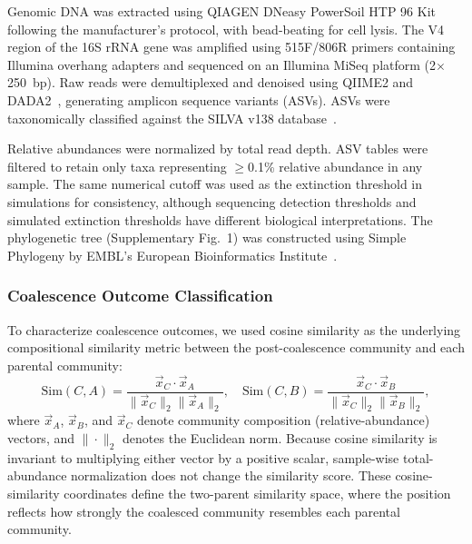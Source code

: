 Genomic DNA was extracted using QIAGEN DNeasy PowerSoil HTP 96 Kit following the manufacturer's protocol, with bead-beating for cell lysis. The V4 region of the 16S rRNA gene was amplified using 515F/806R primers containing Illumina overhang adapters and sequenced on an Illumina MiSeq platform (2$\times$250~bp). Raw reads were demultiplexed and denoised using QIIME2 and DADA2~\citep{Callahan2016}, generating amplicon sequence variants (ASVs). ASVs were taxonomically classified against the SILVA v138 database~\citep{Quast2013}.

Relative abundances were normalized by total read depth. ASV tables were filtered to retain only taxa representing $\geq$0.1\% relative abundance in any sample. The same numerical cutoff was used as the extinction threshold in simulations for consistency, although sequencing detection thresholds and simulated extinction thresholds have different biological interpretations. The phylogenetic tree (Supplementary Fig.~1) was constructed using Simple Phylogeny by EMBL's European Bioinformatics Institute~\citep{Madeira2022}.


\subsubsection*{Coalescence Outcome Classification}
\label{sec:suppl:methods:classification}

To characterize coalescence outcomes, we used cosine similarity as the underlying compositional similarity metric between the post-coalescence community and each parental community:
\begin{equation}
\text{Sim}(C, A) = \frac{\vec{x}_C \cdot \vec{x}_A}{\|\vec{x}_C\|_2 \|\vec{x}_A\|_2}, \quad
\text{Sim}(C, B) = \frac{\vec{x}_C \cdot \vec{x}_B}{\|\vec{x}_C\|_2 \|\vec{x}_B\|_2},
\end{equation}
where $\vec{x}_A$, $\vec{x}_B$, and $\vec{x}_C$ denote community composition (relative-abundance) vectors, and $\|\cdot\|_2$ denotes the Euclidean norm. Because cosine similarity is invariant to multiplying either vector by a positive scalar, sample-wise total-abundance normalization does not change the similarity score. These cosine-similarity coordinates define the two-parent similarity space, where the position reflects how strongly the coalesced community resembles each parental community.


